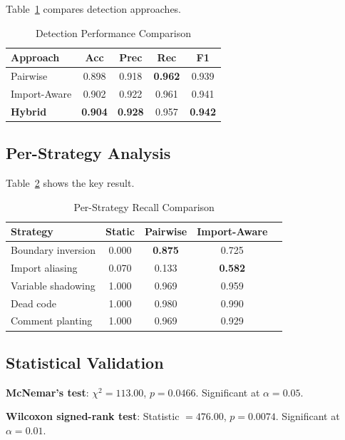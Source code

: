 \documentclass[conference]{IEEEtran}
\begin{document}
Table~\ref{tab:performance} compares detection approaches.

\begin{table}[h]
\centering
\caption{Detection Performance Comparison}
\label{tab:performance}
\begin{tabular}{@{}lcccc@{}}
\toprule
\textbf{Approach} & \textbf{Acc} & \textbf{Prec} & \textbf{Rec} & \textbf{F1} \\
\midrule
Pairwise & 0.898 & 0.918 & \textbf{0.962} & 0.939 \\
Import-Aware & 0.902 & 0.922 & 0.961 & 0.941 \\
\textbf{Hybrid} & \textbf{0.904} & \textbf{0.928} & 0.957 & \textbf{0.942} \\
\bottomrule
\end{tabular}
\end{table}

\subsection{Per-Strategy Analysis}

Table~\ref{tab:per-strategy} shows the key result.

\begin{table}[h]
\centering
\caption{Per-Strategy Recall Comparison}
\label{tab:per-strategy}
\begin{tabular}{@{}lcccc@{}}
\toprule
\textbf{Strategy} & \textbf{Static} & \textbf{Pairwise} & \textbf{Import-Aware} \\
\midrule
Boundary inversion & 0.000 & \textbf{0.875} & 0.725 \\
Import aliasing & 0.070 & 0.133 & \textbf{0.582} \\
Variable shadowing & 1.000 & 0.969 & 0.959 \\
Dead code & 1.000 & 0.980 & 0.990 \\
Comment planting & 1.000 & 0.969 & 0.929 \\
\bottomrule
\end{tabular}
\end{table}

\subsection{Statistical Validation}

\textbf{McNemar's test}: $\chi^2 = 113.00$, $p = 0.0466$. Significant at $\alpha = 0.05$.

\textbf{Wilcoxon signed-rank test}: Statistic $= 476.00$, $p = 0.0074$. Significant at $\alpha = 0.01$.
\end{document}
